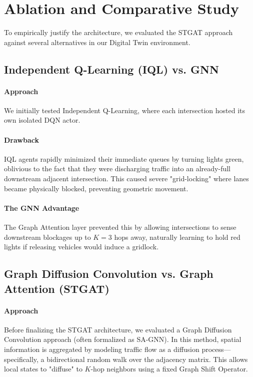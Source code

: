 \documentclass[12pt, onecolumn]{IEEEtran}
\begin{document}
\section{Ablation and Comparative Study}

To empirically justify the architecture, we evaluated the STGAT approach against several alternatives in our Digital Twin environment.

\subsection{Independent Q-Learning (IQL) vs. GNN}
\paragraph{Approach} We initially tested Independent Q-Learning, where each intersection hosted its own isolated DQN actor. \\
\paragraph{Drawback} IQL agents rapidly minimized their immediate queues by turning lights green, oblivious to the fact that they were discharging traffic into an already-full downstream adjacent intersection. This caused severe "grid-locking" where lanes became physically blocked, preventing geometric movement. \\
\paragraph{The GNN Advantage} The Graph Attention layer prevented this by allowing intersections to sense downstream blockages up to $K=3$ hops away, naturally learning to hold red lights if releasing vehicles would induce a gridlock.

\subsection{Graph Diffusion Convolution vs. Graph Attention (STGAT)}
\paragraph{Approach} Before finalizing the STGAT architecture, we evaluated a Graph Diffusion Convolution approach (often formalized as SA-GNN). In this method, spatial information is aggregated by modeling traffic flow as a diffusion process—specifically, a bidirectional random walk over the adjacency matrix. This allows local states to "diffuse" to $K$-hop neighbors using a fixed Graph Shift Operator. \\
\end{document}
